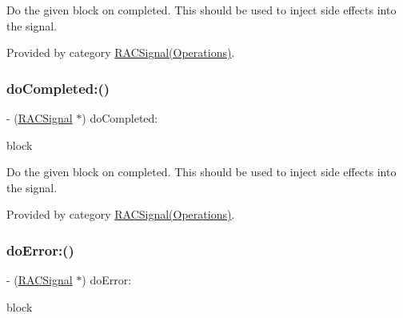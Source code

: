 Do the given block on {\ttfamily completed}. This should be used to inject side effects into the signal. 

Provided by category \mbox{\hyperlink{category_r_a_c_signal_07_operations_08_af88fe4c330bad925ed164ad8f12bdcc8}{R\+A\+C\+Signal(\+Operations)}}.

\mbox{\label{interface_r_a_c_signal_af88fe4c330bad925ed164ad8f12bdcc8}} 
\subsubsection{\texorpdfstring{do\+Completed\+:()}{doCompleted:()}\hspace{0.1cm}{\footnotesize\ttfamily [3/3]}}
{\footnotesize\ttfamily -\/ (\mbox{\hyperlink{interface_r_a_c_signal}{R\+A\+C\+Signal}} $\ast$) do\+Completed\+: \begin{DoxyParamCaption}\item[{(void($^\wedge$)(void))}]{block }\end{DoxyParamCaption}}

Do the given block on {\ttfamily completed}. This should be used to inject side effects into the signal. 

Provided by category \mbox{\hyperlink{category_r_a_c_signal_07_operations_08_af88fe4c330bad925ed164ad8f12bdcc8}{R\+A\+C\+Signal(\+Operations)}}.

\mbox{\label{interface_r_a_c_signal_ac97a1fc7c03123a75746f2602b7444b4}} 
\subsubsection{\texorpdfstring{do\+Error\+:()}{doError:()}\hspace{0.1cm}{\footnotesize\ttfamily [1/3]}}
{\footnotesize\ttfamily -\/ (\mbox{\hyperlink{interface_r_a_c_signal}{R\+A\+C\+Signal}} $\ast$) do\+Error\+: \begin{DoxyParamCaption}\item[{(void($^\wedge$)(N\+S\+Error $\ast$error))}]{block }\end{DoxyParamCaption}}

